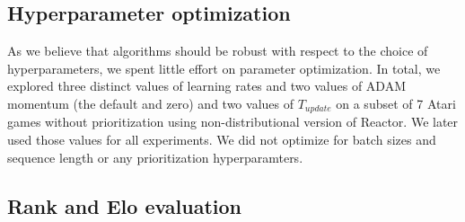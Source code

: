 \documentclass{article}
\begin{document}
\subsection{Hyperparameter optimization}\label{sec:par_opt}
As we believe that algorithms should be robust with respect to the choice of 
hyperparameters, we spent little effort on parameter optimization. In total, we 
explored three distinct values of learning rates and two values of ADAM 
momentum (the default and zero) and two values of $T_{update}$ on a subset of 7 
Atari games without prioritization using non-distributional version of Reactor. 
We later used those values for all experiments. We did not optimize for batch 
sizes and sequence length or any prioritization hyperparamters.

\iffalse
Concatenated rectified linear units are used as non-linearities in the network 
\citep{shang2016understanding}. We did this for two reasons. Firstly, as was 
shown by \cite{shang2016understanding}, convolutional neural networks with 
rectified linear units tend to lead to pairs of opposite features. Using 
concatenated rectified linear units allows to reduce the size of the filters by 
half, saving computation. Secondly, neural networks with rectified linear units 
tend to age when a given unit gets pushed below zero by a wild gradient, and 
being clamped at zero there is no gradient to ever pull it back up again. Using 
concatenated ReLUs helps to solve this problem, because if a neuron 
gets pushed below zero, activation pops up again on the negative side. It is up 
to the next linearity to learn not to use a value if it is not necessary.
\fi

\subsection{Rank and Elo evaluation}
\label{rank-and-elo}
\end{document}
